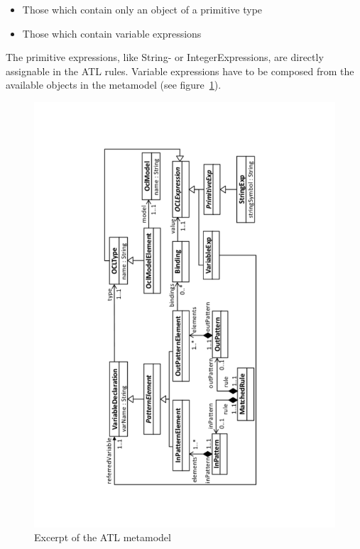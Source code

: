\documentclass{llncs}
\begin{document}
\begin{itemize}
	\item Those which contain only an object of a primitive type
	\item Those which contain variable expressions
\end{itemize}

The primitive expressions, like String- or IntegerExpressions, are directly assignable in the ATL rules. Variable expressions have to be composed from the available objects in the metamodel (see figure~\ref{fig:atl_metamodel_excerpt}).

\begin{figure}
	\centering
	\includegraphics[angle=270,width=1\textwidth,natwidth=610,natheight=642]{figures/ATL_Metamodel_Excerpt}
	\caption{Excerpt of the ATL metamodel}
	\label{fig:atl_metamodel_excerpt}
\end{figure}
\end{document}
